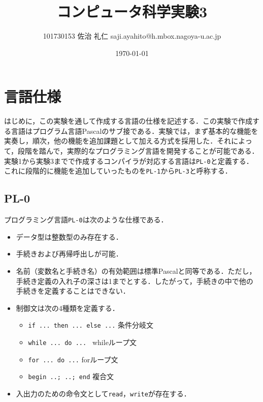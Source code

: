 \documentclass[uplatex]{jsarticle}
\title{コンピュータ科学実験3}
\author{101730153 佐治 礼仁 saji.ayahito@h.mbox.nagoya-u.ac.jp}
\date{\today}
\begin{document}
\maketitle
\section{言語仕様}
はじめに，この実験を通して作成する言語の仕様を記述する．この実験で作成する言語はプログラム言語Pascalのサブ接である．実験では，まず基本的な機能を実奏し，順次，他の機能を追加課題として加える方式を採用した．それによって，段階を踏んで，実際的なプログラミング言語を開発することが可能である．
実験1から実験3までで作成するコンパイラが対応する言語は\verb#PL-0#と定義する．これに段階的に機能を追加していったものを\verb#PL-1#から\verb#PL-3#と呼称する．
\subsection{PL-0}
プログラミング言語\verb#PL-0#は次のような仕様である．
\begin{itemize}
  \item データ型は整数型のみ存在する．
  \item 手続きおよび再帰呼出しが可能．
  \item 名前（変数名と手続き名）の有効範囲は標準Pascalと同等である．ただし，手続き定義の入れ子の深さは1までとする．したがって，手続きの中で他の手続きを定義することはできない．
  \item 制御文は次の4種類を定義する．
  \begin{itemize}
    \item \verb#if ... then ... else ...# 条件分岐文
    \item \verb#while ... do ... # whileループ文
    \item \verb#for ... do ...# forループ文
    \item \verb#begin ..; ..; end# 複合文
  \end{itemize}
  \item 入出力のための命令文として\verb#read#，\verb#write#が存在する．
\end{itemize}
\end{document}
